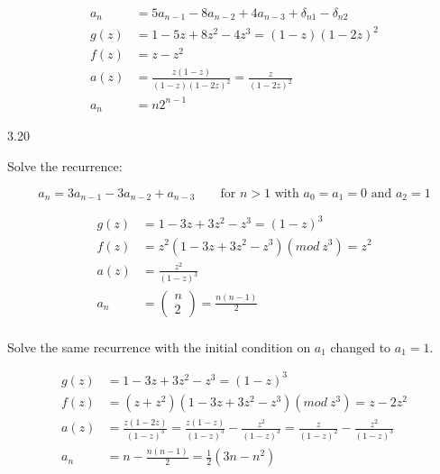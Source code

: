 \documentclass[12pt]{article}
\begin{document}
\begin{equation}
\begin{split}
    a_n & = 5a_{n - 1} - 8a_{n - 2} + 4a_{n - 3} + \delta_{n1} - \delta_{n2} \\
    g(z) & = 1 - 5z + 8z^2 - 4z^3 = (1 - z)(1 - 2z)^2 \\
    f(z) & = z - z^2 \\
    a(z) & = \frac{z(1 - z)}{(1 - z)(1 - 2z)^2} = \frac{z}{(1 - 2z)^2} \\
    a_n & = n2^{n - 1} \nonumber
\end{split}
\end{equation}

3.20

Solve the recurrence:

\begin{equation}
a_n = 3a_{n - 1} - 3a_{n - 2} + a_{n - 3} \qquad \text{for $n > 1$ with $a_0 = a_1 = 0$ and $a_2 = 1$} \nonumber
\end{equation}

\begin{equation}
\begin{split}
    g(z) & = 1 - 3z + 3z^2 - z^3 = (1 - z)^3 \\
    f(z) & = z^2(1 - 3z + 3z^2 - z^3) (mod \ z^3) = z^2 \\
    a(z) & = \frac{z^2}{(1 - z)^3} \\
    a_n & = \left(\!
        \begin{array}{c}
            n \\
            2
        \end{array}
    \!\right) = \frac{n(n - 1)}{2} \\
\nonumber
\end{split}
\end{equation}

Solve the same recurrence with the initial condition on $a_1$ changed to $a_1 = 1$.

\begin{equation}
\begin{split}
    g(z) & = 1 - 3z + 3z^2 - z^3 = (1 - z)^3 \\
    f(z) & = (z + z^2)(1 - 3z + 3z^2 - z^3)(mod\ z^3) = z - 2z^2 \\
    a(z) & = \frac{z(1 - 2z)}{(1 - z)^3} = \frac{z(1 - z)}{(1 - z)^3} - \frac{z^2}{(1 - z)^3} =
    \frac{z}{(1 - z)^2} - \frac{z^2}{(1 - z)^3} \\
    a_n & = n - \frac{n(n - 1)}{2} = \frac{1}{2}(3n - n^2) \\
\nonumber
\end{split}
\end{equation}
\end{document}
